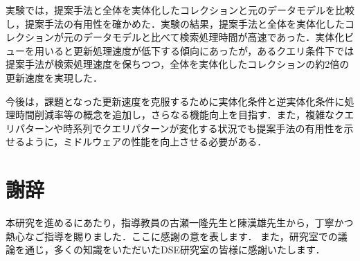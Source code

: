 \documentclass[a4paper,11pt]{ujreport}
\begin{document}
実験では，提案手法と全体を実体化したコレクションと元のデータモデルを比較し，提案手法の有用性を確かめた．実験の結果，提案手法と全体を実体化したコレクションが元のデータモデルと比べて検索処理時間が高速であった．実体化ビューを用いると更新処理速度が低下する傾向にあったが，あるクエリ条件下では提案手法が検索処理速度を保ちつつ，全体を実体化したコレクションの約2倍の更新速度を実現した．

今後は，課題となった更新速度を克服するために実体化条件と逆実体化条件に処理時間削減率等の概念を追加し，さらなる機能向上を目指す．また，複雑なクエリパターンや時系列でクエリパターンが変化する状況でも提案手法の有用性を示せるように，ミドルウェアの性能を向上させる必要がある．


\chapter*{謝辞}
本研究を進めるにあたり，指導教員の古瀬一隆先生と陳漢雄先生から，丁寧かつ熱心なご指導を賜りました．ここに感謝の意を表します．
また，研究室での議論を通じ，多くの知識をいただいたDSE研究室の皆様に感謝いたします．

\newpage

\renewcommand{\bibname}{参考文献}



\end{document}

